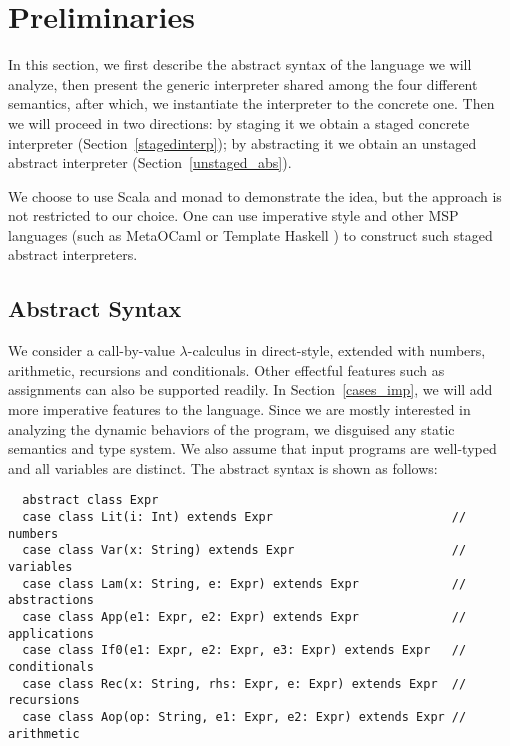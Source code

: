 \newcommand{\TLang}{$L_\lambda$}

\section{Preliminaries} \label{prelim}

In this section, we first describe the abstract syntax of the language we will
analyze, then present the generic interpreter shared among the four different
semantics, after which, we instantiate the interpreter to the concrete one. Then we
will proceed in two directions: by staging it we obtain a staged concrete interpreter
(Section~\ref{stagedinterp}); by abstracting it we obtain an unstaged abstract
interpreter (Section~\ref{unstaged_abs}).

We choose to use Scala and monad to demonstrate the idea, but the approach
is not restricted to our choice. One can use imperative style and other MSP languages 
(such as MetaOCaml \cite{DBLP:conf/gpce/CalcagnoTHL03, DBLP:conf/flops/Kiselyov14} 
or Template Haskell \cite{Sheard:2002:TMH:636517.636528} )
to construct such staged abstract interpreters.

\subsection{Abstract Syntax} \label{bg_lang}

We consider a call-by-value $\lambda$-calculus in direct-style, extended
with numbers, arithmetic, recursions and conditionals. Other effectful features
such as assignments can also be supported readily. In Section~\ref{cases_imp}, we
will add more imperative features to the language. Since we are mostly
interested in analyzing the dynamic behaviors of the program, we disguised any
static semantics and type system. We also assume that input programs are
well-typed and all variables are distinct. The abstract syntax is shown as
follows:

\begin{lstlisting}
  abstract class Expr
  case class Lit(i: Int) extends Expr                         // numbers
  case class Var(x: String) extends Expr                      // variables
  case class Lam(x: String, e: Expr) extends Expr             // abstractions
  case class App(e1: Expr, e2: Expr) extends Expr             // applications
  case class If0(e1: Expr, e2: Expr, e3: Expr) extends Expr   // conditionals
  case class Rec(x: String, rhs: Expr, e: Expr) extends Expr  // recursions
  case class Aop(op: String, e1: Expr, e2: Expr) extends Expr // arithmetic
\end{lstlisting}

